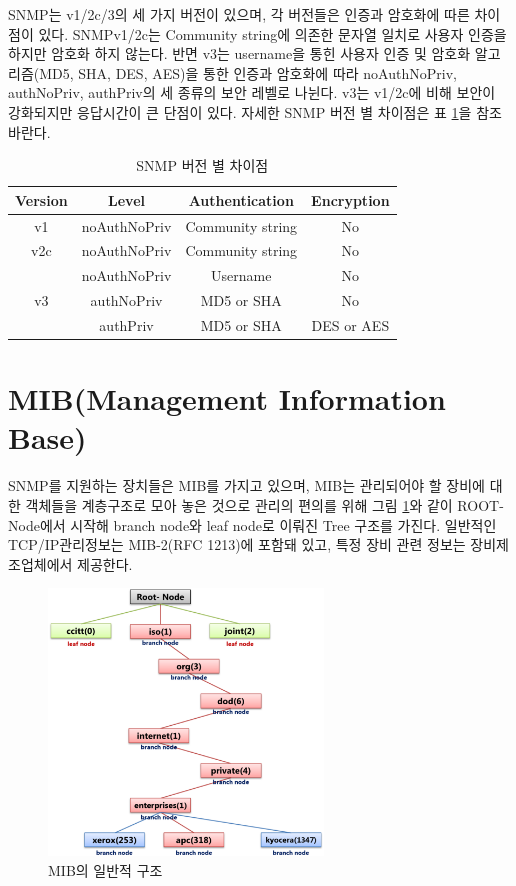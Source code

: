 \documentclass[11pt
  , a4paper
  , article
  , oneside
]{memoir}
\begin{document}
\hfil\break
\hfil\break
\hfil\break
\hfil\break

SNMP는 v1/2c/3의 세 가지 버전이 있으며, 각 버전들은 인증과 암호화에 따른 차이점이 있다. SNMPv1/2c는 Community string에 의존한 문자열 일치로 사용자 인증을 하지만 암호화 하지 않는다. 반면 v3는 username을 통힌 사용자 인증 및 암호화 알고리즘(MD5, SHA, DES, AES)을 통한 인증과 암호화에 따라 noAuthNoPriv, authNoPriv, authPriv의 세 종류의 보안 레벨로 나뉜다. v3는 v1/2c에 비해 보안이 강화되지만 응답시간이 큰 단점이 있다. 자세한 SNMP 버전 별 차이점은 표 \ref{table:conparision}\citep{comparison}을 참조바란다.

\begin{table}[h!]
\begin{center}
\begin{tabular}{c|c|c|c}\hline
Version & Level & Authentication & Encryption \\ \hline
v1 & noAuthNoPriv & Community string & No \\ \hline
v2c & noAuthNoPriv & Community string & No \\ \hline
 & noAuthNoPriv & Username & No \\ \cline{2-4}
v3 & authNoPriv & MD5 or SHA & No \\ \cline{2-4}
 & authPriv & MD5 or SHA & DES or AES \\ \hline
\end{tabular}
\caption{SNMP 버전 별 차이점}
  \label{table:conparision} 
\end{center}
\end{table} 

\clearpage
\section{MIB(Management Information Base)}
SNMP를 지원하는 장치들은 MIB를 가지고 있으며, MIB는 관리되어야 할 장비에 대한 객체들을 계층구조로 모아 놓은 것으로 관리의 편의를 위해 그림 \ref{fig:oid_tree}와 같이 ROOT-Node에서 시작해 branch node와 leaf node로 이뤄진 Tree 구조를 가진다. 일반적인 TCP/IP관리정보는 MIB-2(RFC 1213)에 포함돼 있고, 특정 장비 관련 정보는 장비제조업체에서 제공한다. 

\begin{figure}[h!]
  \centering
  \includegraphics[width=0.65\textwidth]{./images/oidtree.eps}
  \caption{MIB의 일반적 구조}
  \label{fig:oid_tree} 
\end{figure}
\end{document}
